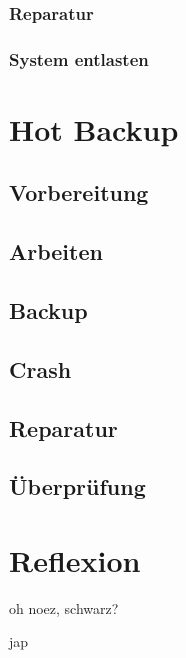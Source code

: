 \documentclass[11pt,a4paper,parskip=half]{scrartcl}
\begin{document}
\subsubsection{Reparatur}
\subsubsection{System entlasten}

\section{Hot Backup}
\subsection{Vorbereitung}
\subsection{Arbeiten}
\subsection{Backup}
\subsection{Crash}
\subsection{Reparatur}
\subsection{Überprüfung}

\section{Reflexion}
oh noez, schwarz?

jap
\end{document}
